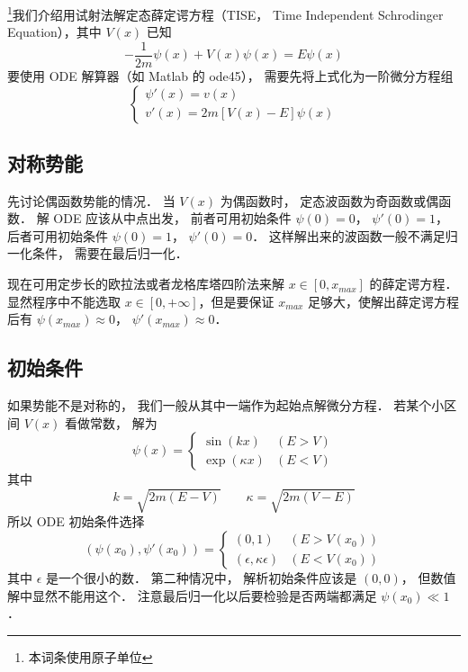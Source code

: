 

\footnote{本词条使用原子单位}我们介绍用试射法解定态薛定谔方程（TISE， Time Independent Schrodinger Equation），其中 $V(x)$ 已知
\begin{equation}
-\frac{1}{2m}\psi(x) + V(x)\psi(x) = E \psi(x)
\end{equation}
要使用 ODE 解算器（如 Matlab 的 ode45）， 需要先将上式化为一阶微分方程组
\begin{equation}
\begin{cases}
\psi'(x) = v(x)\\
v'(x) = 2m[V(x) - E]\psi(x)
\end{cases}
\end{equation}

\subsection{对称势能}
先讨论偶函数势能的情况． 当 $V(x)$ 为偶函数时， 定态波函数为奇函数或偶函数． 解 ODE 应该从中点出发， 前者可用初始条件 $\psi(0)=0$， $\psi'(0)=1$， 后者可用初始条件 $\psi(0)=1$， $\psi'(0)=0$． 这样解出来的波函数一般不满足归一化条件， 需要在最后归一化．

现在可用定步长的欧拉法或者龙格库塔四阶法来解 $x\in [0, x_{max}]$ 的薛定谔方程． 显然程序中不能选取 $x\in [0,+\infty]$，但是要保证 $x_{max}$ 足够大，使解出薛定谔方程后有 $\psi(x_{max})\approx 0$， $\psi'(x_{max})\approx 0$．

\subsection{初始条件}
如果势能不是对称的， 我们一般从其中一端作为起始点解微分方程． 若某个小区间 $V(x)$ 看做常数， 解为
\begin{equation}
\psi(x) =
\begin{cases}
\sin(kx) &(E > V)\\
\exp(\kappa x) & (E < V)
\end{cases}
\end{equation}
其中
\begin{equation}
k = \sqrt{2m(E - V)} \qquad
\kappa = \sqrt{2m(V - E)}
\end{equation}
所以 ODE  初始条件选择
\begin{equation}
(\psi(x_0), \psi'(x_0)) =
\begin{cases}
(0, 1) &(E > V(x_0))\\
(\epsilon, \kappa\epsilon) & (E < V(x_0))
\end{cases}
\end{equation}
其中 $\epsilon$ 是一个很小的数． 第二种情况中， 解析初始条件应该是 $(0, 0)$， 但数值解中显然不能用这个． 注意最后归一化以后要检验是否两端都满足 $\psi(x_0) \ll 1$．

